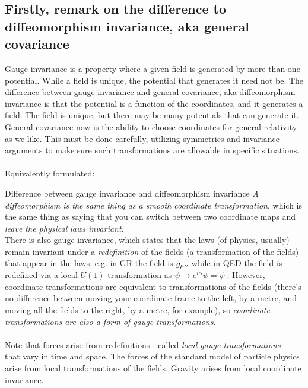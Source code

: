 \subsection{Firstly, remark on the difference to diffeomorphism invariance, aka general covariance}
Gauge invariance is a property where a given field is generated by more than one potential. While a field is unique, the potential that generates it need not be.
The difference between gauge invariance and general covariance, aka diffeomorphism invariance is that the potential is a function of the coordinates, and it generates a field. The field is unique, but there may be many potentials that can generate it.\\
General covariance now is the ability to choose coordinates for general relativity as we like. This must be done carefully, utilizing symmetries and invariance arguments to make sure such transformations are allowable in specific situations.
\\
\\
Equivalently formulated:\\
\begin{mybox}{Difference between gauge invariance and diffeomorphism invariance}
	\emph{A diffeomorphism is the same thing as a smooth coordinate transformation}, which is the same thing as saying that you can switch between two coordinate maps and \emph{leave the physical laws invariant}.\\ 
	There is also gauge invariance, which states that the laws (of physics, usually) remain invariant under a \emph{redefinition} of the fields (a transformation of the fields) that appear in the laws, e.g. in GR the field is $g_{\mu \nu}$ while in QED the field is redefined via a local $U(1)$ transformation as $\psi \rightarrow e^{i \alpha} \psi = \psi^\prime$.  However, coordinate transformations are equivalent to transformations of the fields (there's no difference between moving your coordinate frame to the left, by a metre, and moving all the fields to the right, by a metre, for example), so \emph{coordinate transformations are also a form of gauge transformations}.\\
	\\
	Note that forces arise from redefinitions - called \emph{local gauge transformations} - that vary in time and space.  The forces of the standard model of particle physics arise from local transformations of the fields.  Gravity arises from local coordinate invariance.
\end{mybox}
